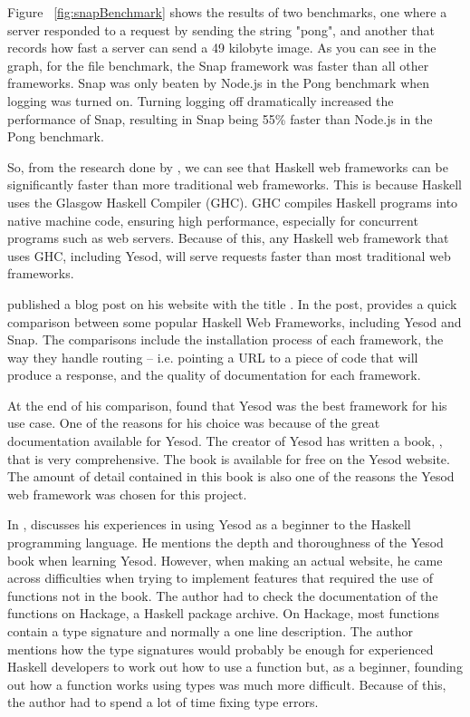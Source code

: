Figure ~\ref{fig:snapBenchmark} shows the results of two benchmarks, one where a server
responded to a request by sending the string "pong", and another that records how fast
a server can send a 49 kilobyte image. As you can see in the
graph, for the file benchmark, the Snap framework was faster than all other frameworks.
Snap was only beaten by Node.js in the Pong benchmark when logging was turned on.
Turning logging off dramatically increased the performance of Snap, resulting in
Snap being 55\% faster than Node.js in the Pong benchmark. \parencite{snapFramework}

So, from the research done by \citeauthor{snapFramework}, we can see that Haskell
web frameworks can be significantly faster than more traditional web frameworks.
This is because Haskell uses the Glasgow Haskell Compiler (GHC). GHC compiles
Haskell programs into native machine code, ensuring high performance, especially
for concurrent programs such as web servers. Because of this, any Haskell web framework
that uses GHC, including Yesod, will serve requests faster than most traditional
web frameworks. \parencite{ghcSite}

\citeauthor{haskellWebComparison} published a blog post on his website with the
title . In the post, \citeauthor{haskellWebComparison}
provides a quick comparison between some popular Haskell Web Frameworks, including
Yesod and Snap. The comparisons include the installation process of each framework,
the way they handle routing -- i.e. pointing a URL to a piece of code that will 
produce a response, and the quality of documentation for each framework. \parencite{haskellWebComparison}

At the end of his comparison, \citeauthor{haskellWebComparison} found that Yesod
was the best framework for his use case. One of the reasons for his choice was
because of the great documentation available for Yesod. The creator of Yesod
has written a book, , that is very comprehensive. The book
is available for free on the Yesod website. The amount of detail contained in this
book is also one of the reasons the Yesod web framework was chosen for this
project. \parencite{haskellWebComparison,yesodBook}

In , \citeauthor{beginnerYesod} discusses his experiences
in using Yesod as a beginner to the Haskell programming language. He mentions
the depth and thoroughness of the Yesod book when learning Yesod. However, when
making an actual website, he came across difficulties when trying to implement
features that required the use of functions not in the book. The author had
to check the documentation of the functions on Hackage, a Haskell package archive.
On Hackage, most functions contain a type signature and normally a one line
description. The author mentions how the type signatures would probably be
enough for experienced Haskell developers to work out how to use a function
but, as a beginner, founding out how a function works using types was much more
difficult. Because of this, the author had to spend a lot of time fixing type
errors. \parencite{beginnerYesod}

